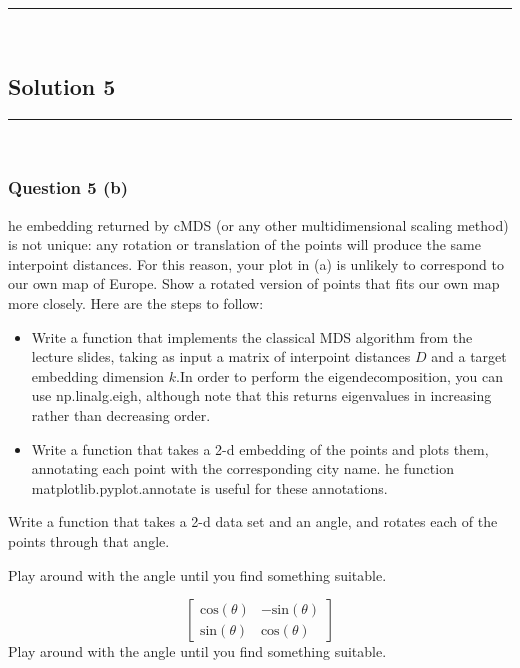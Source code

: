 \documentclass{article}
\begin{document}
\noindent\rule{\textwidth}{0.4pt}\\

\newpage

\subsection*{Solution 5}
\noindent\rule{\textwidth}{0.4pt}\\
\subsubsection*{Question 5 (b)}
\begin{flushleft}
he embedding returned by cMDS (or any other multidimensional scaling method) is not unique:
any rotation or translation of the points will produce the same interpoint distances. For this
reason, your plot in (a) is unlikely to correspond to our own map of Europe. Show a rotated
version of points that ﬁts our own map more closely. Here are the steps to follow:
\begin{itemize}
\item Write a function that implements the classical MDS algorithm from the lecture slides, taking as input a matrix of interpoint distances $D$ and a target embedding dimension $k$.In order
to perform the eigendecomposition, you can use np.linalg.eigh, although note that this
returns eigenvalues in increasing rather than decreasing order.
\item Write a function that takes a 2-d embedding of the points and plots them, annotating each point with the corresponding city name. he function matplotlib.pyplot.annotate is
useful for these annotations.
\end{itemize}
\end{flushleft}
\begin{flushleft}
    \item Write a function that takes a 2-d data set and an angle, and rotates each of the points through that angle.
\item Play around with the angle until you find something suitable.
\end{flushleft}
$$
\begin{bmatrix}
    \text{cos}(\theta) & -\text{sin}(\theta) \\
    \text{sin}(\theta) & \text{cos}(\theta) 
\end{bmatrix}
$$
Play around with the angle until you ﬁnd something suitable.
\end{document}
